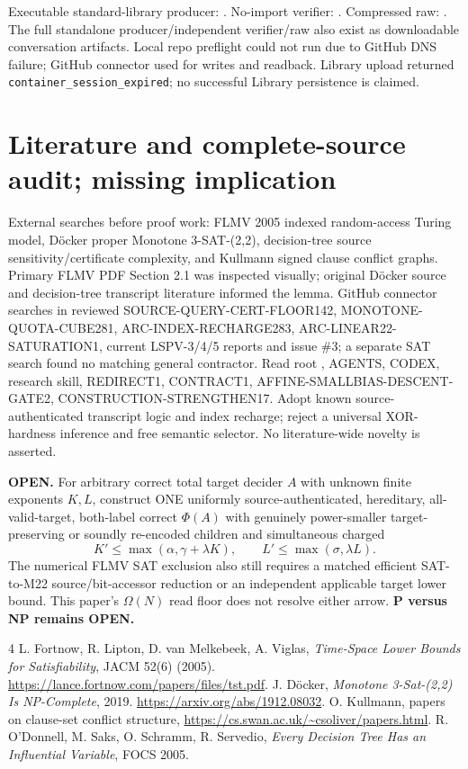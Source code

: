\documentclass[11pt]{article}
\begin{document}
Executable standard-library producer: .
No-import verifier: .
Compressed raw: .
The full standalone producer/independent verifier/raw also exist as downloadable conversation artifacts. Local repo preflight could not run due to GitHub DNS failure; GitHub connector used for writes and readback. Library upload returned \texttt{container\_session\_expired}; no successful Library persistence is claimed.

\section{Literature and complete-source audit; missing implication}
External searches before proof work: FLMV 2005 indexed random-access Turing model, D\"ocker proper Monotone 3-SAT-(2,2), decision-tree source sensitivity/certificate complexity, and Kullmann signed clause conflict graphs. Primary FLMV PDF Section 2.1 was inspected visually; original D\"ocker source and decision-tree transcript literature informed the lemma. GitHub connector searches in  reviewed SOURCE-QUERY-CERT-FLOOR142, MONOTONE-QUOTA-CUBE281, ARC-INDEX-RECHARGE283, ARC-LINEAR22-SATURATION1, current LSPV-3/4/5 reports and issue \#3; a separate  SAT search found no matching general contractor. Read root , AGENTS, CODEX, research skill, REDIRECT1, CONTRACT1, AFFINE-SMALLBIAS-DESCENT-GATE2, CONSTRUCTION-STRENGTHEN17. Adopt known source-authenticated transcript logic and index recharge; reject a universal XOR-hardness inference and free semantic selector. No literature-wide novelty is asserted.

\textbf{OPEN.} For arbitrary correct total target decider \(A\) with unknown finite exponents \(K,L\), construct ONE uniformly source-authenticated, hereditary, all-valid-target, both-label correct \(\Phi(A)\) with genuinely power-smaller target-preserving or soundly re-encoded children and simultaneous charged
\[
K'\le\max(\alpha,\gamma+\lambda K),\qquad L'\le\max(\sigma,\lambda L).
\]
The numerical FLMV SAT exclusion also still requires a matched efficient SAT-to-M22 source/bit-accessor reduction or an independent applicable target lower bound. This paper's \(\Omega(N)\) read floor does not resolve either arrow. \textbf{P versus NP remains OPEN.}
\begin{thebibliography}{4}
 L. Fortnow, R. Lipton, D. van Melkebeek, A. Viglas, \emph{Time-Space Lower Bounds for Satisfiability}, JACM 52(6) (2005). \url{https://lance.fortnow.com/papers/files/tst.pdf}.
 J. D\"ocker, \emph{Monotone 3-Sat-(2,2) Is NP-Complete}, 2019. \url{https://arxiv.org/abs/1912.08032}.
 O. Kullmann, papers on clause-set conflict structure, \url{https://cs.swan.ac.uk/~csoliver/papers.html}.
 R. O'Donnell, M. Saks, O. Schramm, R. Servedio, \emph{Every Decision Tree Has an Influential Variable}, FOCS 2005.
\end{thebibliography}
\end{document}
